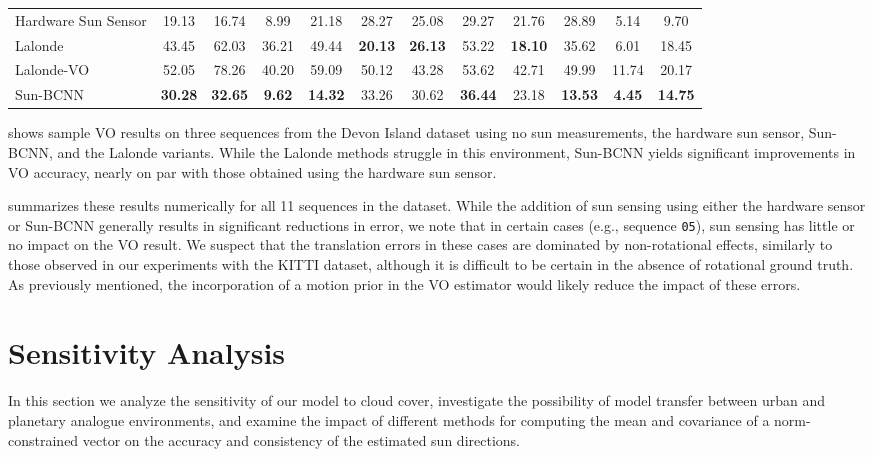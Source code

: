 \begin{table}[h]
{\begin{tabular}{@{}lccccccccccc@{}}
\quad Hardware Sun Sensor & 19.13          & 16.74          & 8.99          & 21.18          & 28.27          & 25.08          & 29.27          & 21.76          & 28.89          & 5.14 & 9.70           \B \\
\quad Lalonde             & 43.45          & 62.03          & 36.21         & 49.44          & \textbf{20.13} & \textbf{26.13} & 53.22          & \textbf{18.10} & 35.62          & 6.01 & 18.45          \T \\
\quad Lalonde-VO          & 52.05          & 78.26          & 40.20         & 59.09          & 50.12          & 43.28          & 53.62          & 42.71          & 49.99          & 11.74& 20.17          \\
\quad Sun-BCNN            & \textbf{30.28} & \textbf{32.65} & \textbf{9.62} & \textbf{14.32} & 33.26          & 30.62          & \textbf{36.44} & 23.18          & \textbf{13.53} & \textbf{4.45} & \textbf{14.75} \\ \bottomrule
\end{tabular}
}
\end{table}

 shows sample VO results on three sequences from the Devon Island dataset using no sun measurements, the hardware sun sensor, Sun-BCNN, and the Lalonde variants.
While the Lalonde methods struggle in this environment, Sun-BCNN yields significant improvements in VO accuracy, nearly on par with those obtained using the hardware sun sensor.

 summarizes these results numerically for all 11 sequences in the dataset.
While the addition of sun sensing using either the hardware sensor or Sun-BCNN generally results in significant reductions in error, we note that in certain cases (e.g., sequence \texttt{05}), sun sensing has little or no impact on the VO result.
We suspect that the translation errors in these cases are dominated by non-rotational effects, similarly to those observed in our experiments with the KITTI dataset, although it is difficult to be certain in the absence of rotational ground truth.
As previously mentioned, the incorporation of a motion prior in the VO estimator would likely reduce the impact of these errors.

\section{Sensitivity Analysis}
In this section we analyze the sensitivity of our model to cloud cover, investigate the possibility of model transfer between urban and planetary analogue environments, and examine the impact of different methods for computing the mean and covariance of a norm-constrained vector on the accuracy and consistency of the estimated sun directions.

